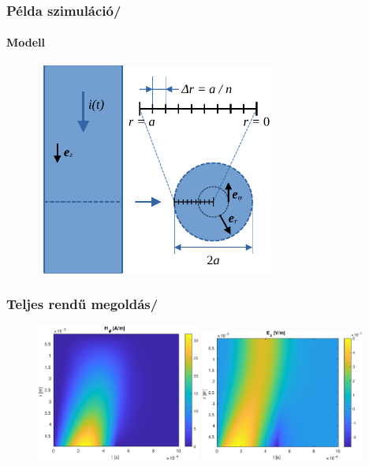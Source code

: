 \documentclass[aspectratio=43]{beamer}
\newcommand{\numframetitle}[1]{\frametitle{#1\hfill\insertframenumber/\insertpresentationendpage\hspace{-\fill}}}
\begin{document}
\begin{frame}
	\numframetitle{Példa szimuláció}
    \framesubtitle{Modell}
    	\begin{figure}
			\includegraphics[width=0.7\textwidth]{kep/modell.pdf}
		\end{figure}
\end{frame}
\begin{frame}
	\numframetitle{Teljes rendű megoldás}
    	\begin{figure}
			\includegraphics[width=0.48\textwidth]{kep/euler_0.15_4_hphi_waterfall.eps}
			\includegraphics[width=0.48\textwidth]{kep/euler_0.15_4_ez_waterfall.eps}
		\end{figure}
\end{frame}
\end{document}
